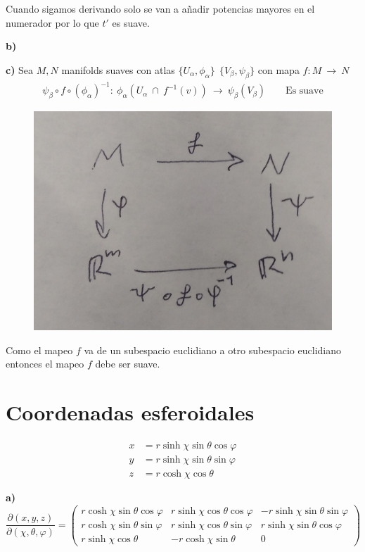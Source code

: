 \documentclass{article}
\begin{document}
Cuando sigamos derivando solo se van a añadir potencias mayores en el numerador por lo que $ t'  $ es suave.

\hfill 

\textbf{b)}

\hfill 

\textbf{c)} Sea $ M,N  $ manifolds suaves con atlas $ \{U_\alpha, \phi_\alpha\} \ \ \{V_\beta, \psi_\beta\} $ con mapa $ f: M\ \rightarrow \ N  $
\begin{gather*}
    \psi_\beta \circ f \circ (\phi_\alpha)^ {-1 } : \ \phi_\alpha(U_\alpha \ \cap \ f ^ {-1 }(v)) \ \rightarrow  \ \psi_\beta(V_\beta) \qquad \text{Es suave} 
\end{gather*}
\begin{figure}[H]
    \centering
    \includegraphics[width=0.40\linewidth]{suave.png}
\end{figure}
Como el mapeo $ f  $ va de un subespacio euclidiano a otro subespacio euclidiano entonces el mapeo $ f  $ debe ser suave.

\hfill 









\section{Coordenadas esferoidales }
\begin{align*}
x &= r \sinh \chi \sin \theta \cos \varphi \\
y &= r \sinh \chi \sin \theta \sin \varphi \\
z &= r \cosh \chi \cos \theta
\end{align*}

\textbf{a)} 
\[
\frac{\partial (x, y, z)}{\partial (\chi, \theta, \varphi)} = 
\begin{pmatrix}
r \cosh \chi \sin \theta \cos \varphi & r \sinh \chi \cos \theta \cos \varphi & -r \sinh \chi \sin \theta \sin \varphi \\
r \cosh \chi \sin \theta \sin \varphi & r \sinh \chi \cos \theta \sin \varphi & r \sinh \chi \sin \theta \cos \varphi \\
r \sinh \chi \cos \theta & -r \cosh \chi \sin \theta & 0
\end{pmatrix}
\]
\end{document}
